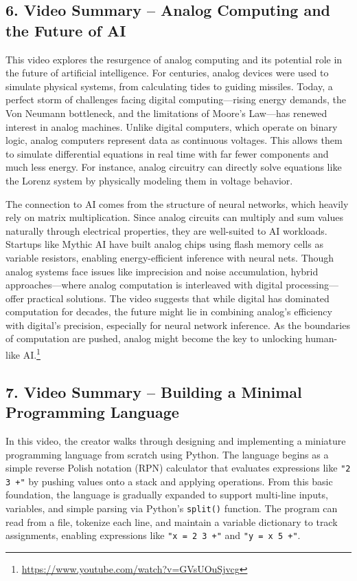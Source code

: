 \documentclass{article}
\theoremstyle{theorem}
\theoremstyle{definition}
\theoremstyle{remark}
\begin{document}
\newpage

\subsection*{6. Video Summary – Analog Computing and the Future of AI}

This video explores the resurgence of analog computing and its potential role in the future of artificial intelligence. For centuries, analog devices were used to simulate physical systems, from calculating tides to guiding missiles. Today, a perfect storm of challenges facing digital computing—rising energy demands, the Von Neumann bottleneck, and the limitations of Moore’s Law—has renewed interest in analog machines. Unlike digital computers, which operate on binary logic, analog computers represent data as continuous voltages. This allows them to simulate differential equations in real time with far fewer components and much less energy. For instance, analog circuitry can directly solve equations like the Lorenz system by physically modeling them in voltage behavior.

The connection to AI comes from the structure of neural networks, which heavily rely on matrix multiplication. Since analog circuits can multiply and sum values naturally through electrical properties, they are well-suited to AI workloads. Startups like Mythic AI have built analog chips using flash memory cells as variable resistors, enabling energy-efficient inference with neural nets. Though analog systems face issues like imprecision and noise accumulation, hybrid approaches—where analog computation is interleaved with digital processing—offer practical solutions. The video suggests that while digital has dominated computation for decades, the future might lie in combining analog's efficiency with digital's precision, especially for neural network inference. As the boundaries of computation are pushed, analog might become the key to unlocking human-like AI.\footnote{\url{https://www.youtube.com/watch?v=GVsUOuSjvcg}}

\subsection*{7. Video Summary – Building a Minimal Programming Language}

In this video, the creator walks through designing and implementing a miniature programming language from scratch using Python. The language begins as a simple reverse Polish notation (RPN) calculator that evaluates expressions like \texttt{"2 3 +"} by pushing values onto a stack and applying operations. From this basic foundation, the language is gradually expanded to support multi-line inputs, variables, and simple parsing via Python's \texttt{split()} function. The program can read from a file, tokenize each line, and maintain a variable dictionary to track assignments, enabling expressions like \texttt{"x = 2 3 +"} and \texttt{"y = x 5 +"}.
\end{document}
